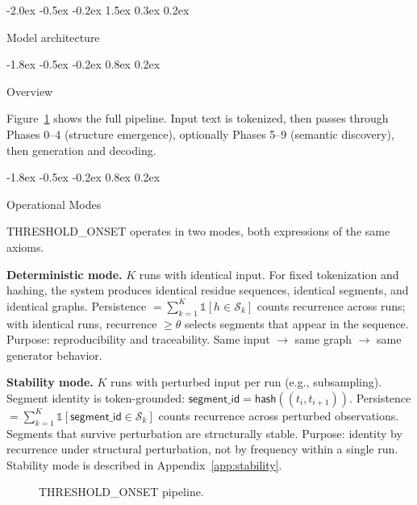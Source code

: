 \documentclass[10pt]{article}
\makeatletter
\renewcommand{\section}{\@startsection{section}{1}{\z@}%
  {-2.0ex \@plus -0.5ex \@minus -0.2ex}%
  {1.5ex \@plus 0.3ex \@minus 0.2ex}%
  {\large\bfseries\raggedright}}
\renewcommand{\subsection}{\@startsection{subsection}{2}{\z@}%
  {-1.8ex \@plus -0.5ex \@minus -0.2ex}%
  {0.8ex \@plus 0.2ex}%
  {\normalsize\bfseries\raggedright}}
\makeatother
\begin{document}
\section{Model architecture}
\label{sec:model}

\subsection{Overview}

Figure~\ref{fig:pipeline} shows the full pipeline. Input text is tokenized, then passes through Phases 0--4 (structure emergence), optionally Phases 5--9 (semantic discovery), then generation and decoding.

\subsection{Operational Modes}

THRESHOLD\_ONSET operates in two modes, both expressions of the same axioms.

\textbf{Deterministic mode.}
$K$ runs with identical input. For fixed tokenization and hashing, the system produces identical residue sequences, identical segments, and identical graphs. Persistence $= \sum_{k=1}^{K} \mathbb{1}[h \in \mathcal{S}_k]$ counts recurrence across runs; with identical runs, recurrence $\geq \theta$ selects segments that appear in the sequence. Purpose: reproducibility and traceability. Same input $\rightarrow$ same graph $\rightarrow$ same generator behavior.

\textbf{Stability mode.}
$K$ runs with perturbed input per run (e.g., subsampling). Segment identity is token-grounded: $\mathsf{segment\_id} = \mathsf{hash}((t_i, t_{i+1}))$. Persistence $= \sum_{k=1}^{K} \mathbb{1}[\mathsf{segment\_id} \in \mathcal{S}_k]$ counts recurrence across perturbed observations. Segments that survive perturbation are structurally stable. Purpose: identity by recurrence under structural perturbation, not by frequency within a single run. Stability mode is described in Appendix~\ref{app:stability}.

\begin{figure}[t]
\centering
{}
\caption{THRESHOLD\_ONSET pipeline.}
\label{fig:pipeline}
\end{figure}
\end{document}
